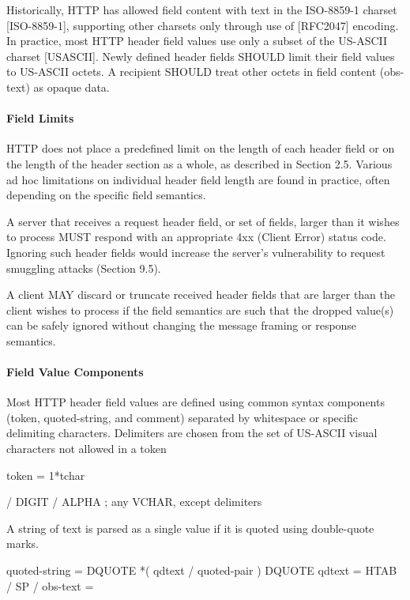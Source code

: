 Historically, HTTP has allowed field content with text in the
ISO-8859-1 charset [ISO-8859-1], supporting other charsets only
through use of [RFC2047] encoding.  In practice, most HTTP header
field values use only a subset of the US-ASCII charset [USASCII].
Newly defined header fields SHOULD limit their field values to
US-ASCII octets.  A recipient SHOULD treat other octets in field
content (obs-text) as opaque data.
\paragraph{Field Limits }
HTTP does not place a predefined limit on the length of each header
field or on the length of the header section as a whole, as described
in Section 2.5.  Various ad hoc limitations on individual header
field length are found in practice, often depending on the specific
field semantics.

A server that receives a request header field, or set of fields,
larger than it wishes to process MUST respond with an appropriate 4xx
(Client Error) status code.  Ignoring such header fields would
increase the server's vulnerability to request smuggling attacks
(Section 9.5).

A client MAY discard or truncate received header fields that are
larger than the client wishes to process if the field semantics are
such that the dropped value(s) can be safely ignored without changing
the message framing or response semantics.
\paragraph{Field Value Components}

Most HTTP header field values are defined using common syntax
components (token, quoted-string, and comment) separated by
whitespace or specific delimiting characters.  Delimiters are chosen
from the set of US-ASCII visual characters not allowed in a token

  token          = 1*tchar

                 / DIGIT / ALPHA
                 ; any VCHAR, except delimiters

A string of text is parsed as a single value if it is quoted using
double-quote marks.

  quoted-string  = DQUOTE *( qdtext / quoted-pair ) DQUOTE
  qdtext         = HTAB / SP /%
  obs-text       = %

